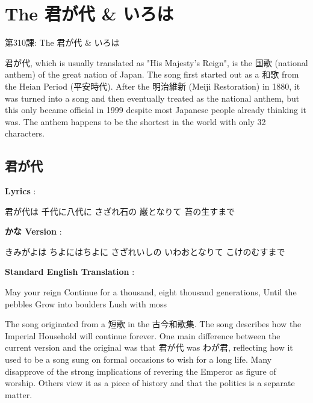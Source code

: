     
\chapter{The 君が代 \& いろは}

\begin{center}
\begin{Large}
第310課: The 君が代 \& いろは 
\end{Large}
\end{center}
 
\par{ 君が代, which is usually translated as "His Majesty's Reign", is the 国歌 (national anthem) of the great nation of Japan. The song first started out as a 和歌 from the Heian Period (平安時代). After the 明治維新 (Meiji Restoration) in 1880, it was turned into a song and then eventually treated as the national anthem, but this only became official in 1999 despite most Japanese people already thinking it was. The anthem happens to be the shortest in the world with only 32 characters. }
      
\section{君が代}
 
\par{\textbf{Lyrics }: }

\begin{center}
君が代は \hfill\break
千代に八代に \hfill\break
さざれ石の \hfill\break
巌となりて \hfill\break
苔の生すまで 
\end{center}

\par{\textbf{かな Version }: }

\begin{center}
きみがよは \hfill\break
ちよにはちよに \hfill\break
さざれいしの \hfill\break
いわおとなりて \hfill\break
こけのむすまで 
\end{center}

\par{\textbf{Standard English Translation }: }

\begin{center}
May your reign \hfill\break
Continue for a thousand, eight thousand generations, \hfill\break
Until the pebbles \hfill\break
Grow into boulders \hfill\break
Lush with moss 
\end{center}

\par{ The song originated from a 短歌 in the 古今和歌集. The song describes how the Imperial Household will continue forever. One main difference between the current version and the original was that 君が代 was わが君, reflecting how it used to be a song sung on formal occasions to wish for a long life. Many disapprove of the strong implications of revering the Emperor as figure of worship. Others view it as a piece of history and that the politics is a separate matter. }
      
